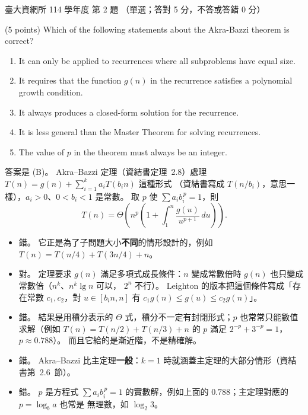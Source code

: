 \begin{pastexam}[label={px:ntu-114-dsa-02}]{臺大資網所 114 學年度 第 2 題}
（單選；答對 5 分，不答或答錯 0 分）

(5 points) Which of the following statements about the Akra-Bazzi theorem is correct?
\begin{enumerate}[label=(\Alph*)]
\item It can only be applied to recurrences where all subproblems have equal size.
\item It requires that the function $g(n)$ in the recurrence satisfies a polynomial growth condition.
\item It always produces a closed-form solution for the recurrence.
\item It is less general than the Master Theorem for solving recurrences.
\item The value of $p$ in the theorem must always be an integer.
\end{enumerate}
\end{pastexam}

\begin{pastsoln}
答案是 (B)。 Akra--Bazzi 定理（資結書定理~2.8）處理 $T(n) = g(n) + \sum_{i=1}^{k} a_i T(b_i n)$ 這種形式
（資結書寫成 $T(n/b_i)$，意思一樣），$a_i > 0$、$0 < b_i < 1$ 是常數。 取 $p$ 使 $\sum a_i b_i^{\,p} = 1$，則
\[
T(n) = \Theta\!\left(n^{p}\left(1 + \int_{1}^{n} \frac{g(u)}{u^{p+1}}\, du\right)\right).
\]

\begin{itemize}
\item[(A)] 錯。 它正是為了子問題大小\textbf{不同}的情形設計的，例如 $T(n) = T(n/4) + T(3n/4) + n$。
\item[(B)] 對。 定理要求 $g(n)$ 滿足多項式成長條件：$n$ 變成常數倍時 $g(n)$ 也只變成常數倍（$n^k$、$n^k \lg n$ 可以，
$2^n$ 不行）。 Leighton 的版本把這個條件寫成「存在常數 $c_1, c_2$，對 $u \in [b_i n, n]$ 有
$c_1 g(n) \le g(u) \le c_2 g(n)$」。
\item[(C)] 錯。 結果是用積分表示的 $\Theta$ 式，積分不一定有封閉形式；$p$ 也常常只能數值求解（例如
$T(n) = T(n/2) + T(n/3) + n$ 的 $p$ 滿足 $2^{-p} + 3^{-p} = 1$，$p \approx 0.788$）。 而且它給的是漸近階，不是精確解。
\item[(D)] 錯。 Akra--Bazzi 比主定理\textbf{一般}：$k = 1$ 時就涵蓋主定理的大部分情形（資結書第~2.6~節）。
\item[(E)] 錯。 $p$ 是方程式 $\sum a_i b_i^{\,p} = 1$ 的實數解，例如上面的 $0.788$；主定理對應的 $p = \log_b a$ 也常是
無理數，如 $\log_2 3$。
\end{itemize}
\end{pastsoln}
